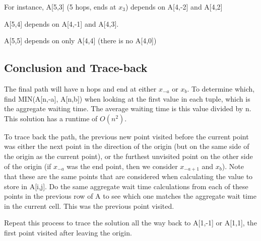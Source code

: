 \documentclass[a4paper]{article}
\begin{document}
For instance, A[5,3] (5 hops, ends at $x_3$) depends on A[4,-2] and A[4,2]

A[5,4] depends on A[4,-1] and A[4,3].

A[5,5] depends on only A[4,4] (there is no A[4,0])

\subsection{Conclusion and Trace-back}
The final path will have n hops and end at either $x_{-a}$ or $x_b$. To determine which, find MIN(A[n,-a], A[n,b]) when looking at the first value in each tuple, which is the aggregate waiting time. The average waiting time is this value divided by n. This solution has a runtime of $O(n^2)$.

To trace back the path, the previous new point visited before the current point was either the next point in the direction of the origin (but on the same side of the origin as the current point), or the furthest unvisited point on the other side of the origin (if $x_{-a}$ was the end point, then we consider $x_{-a+1}$ and $x_b$). Note that these are the same points that are considered when calculating the value to store in A[i,j]. Do the same aggregate wait time calculations from each of these points in the previous row of A to see which one matches the aggregate wait time in the current cell. This was the previous point visited.

Repeat this process to trace the solution all the way back to A[1,-1] or A[1,1], the first point visited after leaving the origin. 
\end{document}
